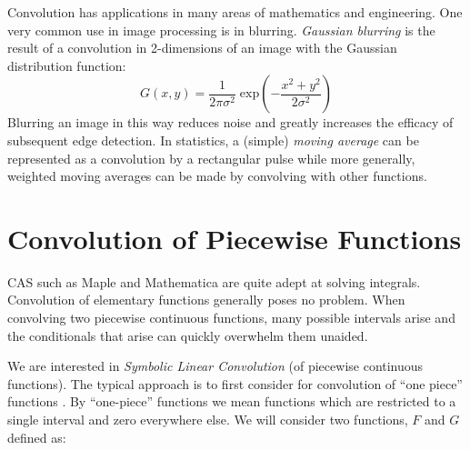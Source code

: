 Convolution has applications in many areas of mathematics and engineering.
One very common use in image processing is in blurring.
\emph{Gaussian blurring} is the result of a convolution in 2-dimensions of an image with the Gaussian distribution function:
\begin{equation}
	\label{eqn:2dGaussian}
	G(x,y) = \frac{1}{2 \pi \sigma^2} \; \text{exp} \left( - \frac{x^2 + y^2}{2\sigma^2} \right)
\end{equation}
Blurring an image in this way reduces noise and greatly increases the efficacy of subsequent edge detection.
In statistics, a (simple) \emph{moving average} can be represented as a convolution by a rectangular pulse while more
generally, weighted moving averages can be made by convolving with other functions.





%
%
\section{Convolution of Piecewise Functions}\label{sec:PWConvolution}


CAS such as Maple and Mathematica are quite adept at solving integrals.
Convolution of elementary functions generally poses no problem.
When convolving two piecewise continuous functions, many possible intervals arise and the conditionals that arise
can quickly overwhelm them unaided.


We are interested in \emph{Symbolic Linear Convolution} (of piecewise continuous functions).
The typical approach is to first consider for convolution of ``one piece'' functions 
\cite{evans1994algorithms, west1993symbolic}.
By ``one-piece'' functions we mean functions which are restricted to a single interval and zero everywhere else.
We will consider two functions, $F$ and $G$ defined as:


